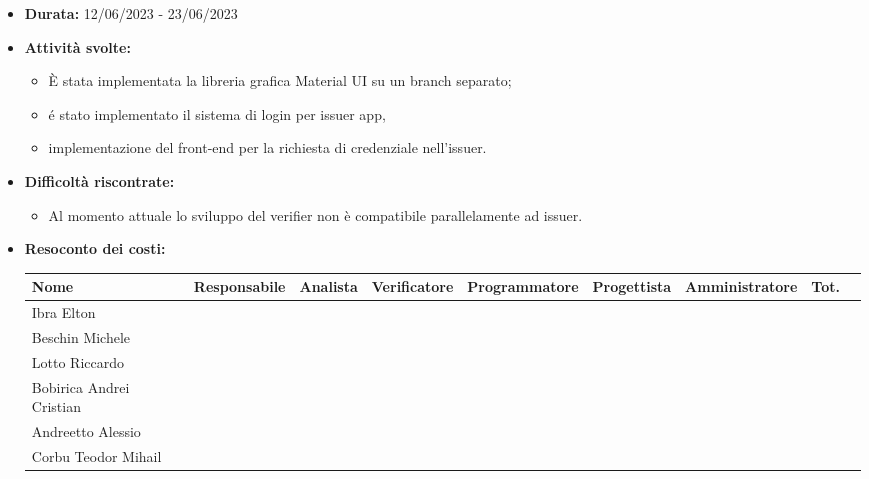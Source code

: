 \begin{itemize}
    \item \textbf{Durata:} 12/06/2023 - 23/06/2023 
    \item \textbf{Attività svolte:}
    \begin{itemize}
        \item È stata implementata la libreria grafica Material UI su un branch separato;
        \item é stato implementato il sistema di login per issuer app, 
        \item implementazione del front-end per la richiesta di credenziale nell'issuer.
    \end{itemize}
    \item \textbf{Difficoltà riscontrate:}
    \begin{itemize}
        \item Al momento attuale lo sviluppo del verifier non è compatibile parallelamente ad issuer.
    \end{itemize}
    \item \textbf{Resoconto dei costi:}
    \begin{longtable}{|p{}|c|c|c|c|c|c|c|c|}
        \hline
        Nome & Responsabile & Analista & Verificatore & Programmatore & Progettista & Amministratore & Tot.\\
        \hline
        Ibra Elton & & & & & & &\\
        \hline
        Beschin Michele & & & & & & & \\
        \hline
        Lotto Riccardo & & & & & & & \\
        \hline
        Bobirica Andrei Cristian & & & & & & & \\
        \hline
        Andreetto Alessio & & & & & & & \\
        \hline
        Corbu Teodor Mihail & & & & & & & \\
        \hline
    \end{longtable}
    \end{itemize}


